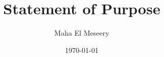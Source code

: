 \documentclass[a4paper,12pt]{article}%
\begin{document}
\title{Statement of Purpose}
\author{Maha El Meseery }
 
\date{\today}
 
\maketitle 

% 
%  
%  
% 	  
% 	  
% 	  	  
% 
% 	  
\end{document}
